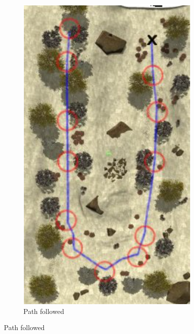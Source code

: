 \documentclass[runningheads]{llncs}
\begin{document}
\begin{figure}[ht]
\begin{subfigure}[b]{0.3\linewidth}
        \includegraphics[width=\linewidth]{img/HillSide_PathFollowed.png}
        \caption{Path followed}
        \label{fig:subfig2}
    \end{subfigure}

    \vspace{0.3cm}


\end{figure}
\end{document}
